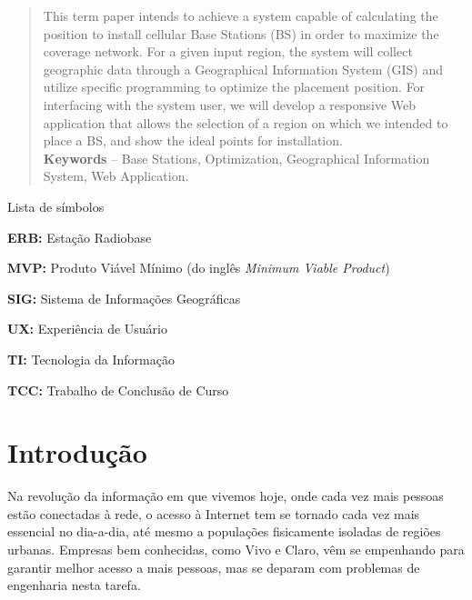 \documentclass[]{politex}
\begin{document}
\begin{abstract}
This term paper intends to achieve a system capable of calculating the position
to install cellular Base Stations (BS) in order to maximize the coverage
network. For a given input region, the system will collect geographic data
through a Geographical Information System (GIS) and utilize specific programming
to optimize the placement position. For interfacing with the system user, we
will develop a responsive Web application that allows the selection of a region
on which we intended to place a BS, and show the ideal points for installation.
\\[3\baselineskip]
%
\textbf{Keywords} -- Base Stations, Optimization, Geographical Information
System, Web Application.
\end{abstract}


\listadefiguras
\listadetabelas

\begin{pretextualsection}{Lista de símbolos}

\textbf{ERB:} Estação Radiobase

\textbf{MVP:} Produto Viável Mínimo (do inglês \textit{Minimum Viable Product})

\textbf{SIG:} Sistema de Informações Geográficas

\textbf{UX:} Experiência de Usuário

\textbf{TI:} Tecnologia da Informação

\textbf{TCC:} Trabalho de Conclusão de Curso

\end{pretextualsection}

\sumario




\chapter{Introdução}

Na revolução da informação em que vivemos hoje, onde cada vez mais pessoas
estão conectadas à rede, o acesso à Internet tem se tornado cada vez mais
essencial no dia-a-dia, até mesmo a populações fisicamente isoladas de regiões
urbanas. Empresas bem conhecidas, como Vivo e Claro, vêm se empenhando para
garantir melhor acesso a mais pessoas, mas se deparam com problemas de
engenharia nesta tarefa.
\end{document}
